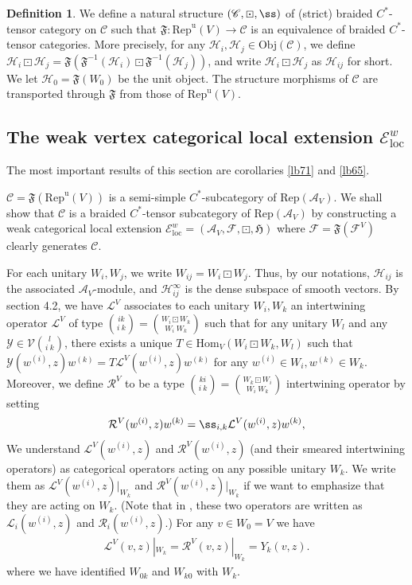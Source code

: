 \documentclass[12pt,a4paper]{article}
\theoremstyle{definition}
\newtheorem{df}{Definition}[subsection]
\theoremstyle{plain}
\newcommand{\fk}{\mathfrak}
\newcommand{\mc}{\mathcal}
\newcommand{\Hom}{\mathrm{Hom}}
\newcommand{\Rep}{\mathrm{Rep}}
\newcommand{\loc}{\mathrm{loc}}
\newcommand{\scr}{\mathscr}
\newcommand{\RepuV}{\mathrm{Rep}^{\mathrm u}(V)}
\newcommand{\Obj}{\mathrm{Obj}}
\numberwithin{equation}{subsection}
\begin{document}
\begin{df}
We define a natural structure $(\scr C,\boxdot,\ss)$ of (strict) braided $C^*$-tensor category on $\scr C$ such that $\fk F:\RepuV\rightarrow\scr C$ is an equivalence of braided $C^*$-tensor categories. More precisely, for any $\mc H_i,\mc H_j\in\Obj(\scr C)$, we define $\mc H_i\boxdot\mc H_j=\fk F(\fk F^{-1}(\mc H_i)\boxdot\fk F^{-1}(\mc H_j))$, and write $\mc H_i\boxdot\mc H_j$ as $\mc H_{ij}$ for short. We let $\mc H_0=\fk F(W_0)$ be the unit object. The structure morphisms of $\scr C$ are transported through $\fk F$ from those of $\RepuV$.
\end{df}


\subsection{The weak vertex categorical local extension $\scr E^w_\loc$}\label{lb68}


The most important results of this section are corollaries \ref{lb71} and \ref{lb65}.




$\scr C=\fk F(\RepuV)$ is a semi-simple $C^*$-subcategory of $\Rep(\mc A_V)$. We shall show that $\scr C$ is a braided $C^*$-tensor subcategory of $\Rep(\mc A_V)$ by constructing a weak categorical local extension $\scr E^w_\loc=(\mc A_V,\mc F,\boxdot,\fk H)$ where $\mc F=\fk F(\mc F^V)$ clearly generates $\scr C$.

For each unitary $W_i,W_j$, we write $W_{ij}=W_i\boxdot W_j$. Thus, by our notations, $\mc H_{ij}$ is the associated $\mc A_V$-module, and $\mc H_{ij}^\infty$ is the dense subspace of smooth vectors. By \cite{Gui21a} section 4.2, we have $\mc L^V$ associates to each unitary $W_i,W_k$  an intertwining operator $\mc L^V$ of type ${ik\choose i~k}={W_i\boxdot W_k\choose W_i~W_k}$ such that for any unitary $W_l$ and any $\mc Y\in\mc V{l\choose i~k}$, there exists a unique $T\in\Hom_V(W_i\boxdot W_k,W_l)$ such that $\mc Y(w^{(i)},z)w^{(k)}=T\mc L^V(w^{(i)},z)w^{(k)}$ for any $w^{(i)}\in W_i,w^{(k)}\in W_k$. Moreover,  we define $\mc R^V$ to be a type ${ki\choose i~k}={W_k\boxdot W_i\choose W_i~W_k}$ intertwining operator by setting
\begin{align}
\mc R^V(w^{(i)},z)w^{(k)}=\ss_{i,k}\mc L^V(w^{(i)},z)w^{(k)},
\end{align}
We understand $\mc L^V(w^{(i)},z)$ and $\mc R^V(w^{(i)},z)$ (and their smeared intertwining operators) as categorical operators acting on any possible unitary $W_k$. We write them as $\mc L^V(w^{(i)},z)|_{W_k}$ and $\mc R^V(w^{(i)},z)|_{W_k}$ if we want to emphasize that they are acting on $W_k$. (Note that in \cite{Gui21a}, these two operators are written as $\mc L_i(w^{(i)},z)$ and $\mc R_i(w^{(i)},z)$.) For any $v\in W_0=V$ we have
\begin{align}
\mc L^V(v,z)|_{W_k}=\mc R^V(v,z)|_{W_k}=Y_k(v,z).
\end{align}
where we have identified $W_{0k}$ and $W_{k0}$ with $W_k$.
\end{document}
